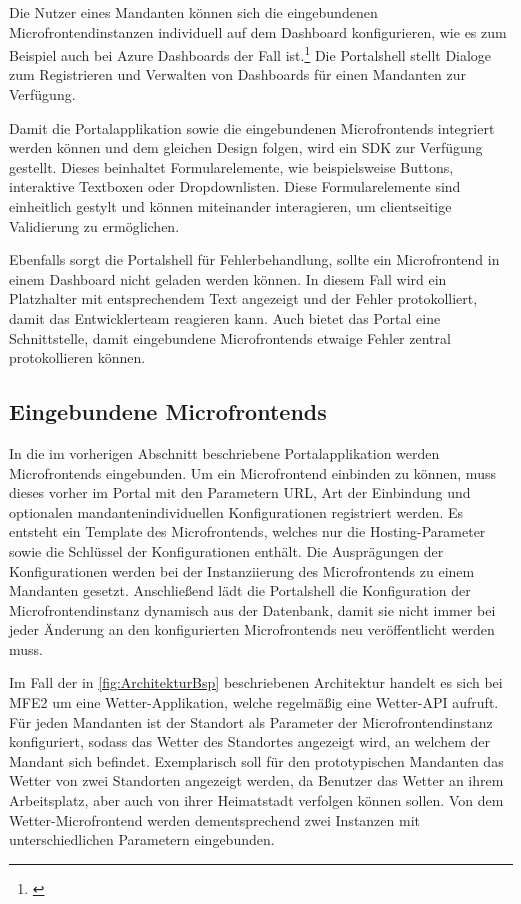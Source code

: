 Die Nutzer eines Mandanten können sich die eingebundenen Microfrontendinstanzen individuell auf dem Dashboard konfigurieren, wie es zum Beispiel auch bei Azure Dashboards der Fall ist.\footnote{\cite[vgl.][]{Microsoft2021a}} Die Portalshell stellt Dialoge zum Registrieren und Verwalten von Dashboards für einen Mandanten zur Verfügung.

Damit die Portalapplikation sowie die eingebundenen Microfrontends integriert werden können und dem gleichen Design folgen, wird ein \gls{SDK} zur Verfügung gestellt. Dieses beinhaltet Formularelemente, wie beispielsweise Buttons, interaktive Textboxen oder Dropdownlisten. Diese Formularelemente sind einheitlich gestylt und können miteinander interagieren, um clientseitige Validierung zu ermöglichen.

Ebenfalls sorgt die Portalshell für Fehlerbehandlung, sollte ein Microfrontend in einem Dashboard nicht geladen werden können. In diesem Fall wird ein Platzhalter mit entsprechendem Text angezeigt und der Fehler protokolliert, damit das Entwicklerteam reagieren kann. Auch bietet das Portal eine Schnittstelle, damit eingebundene Microfrontends etwaige Fehler zentral protokollieren können.

\subsection{Eingebundene Microfrontends}\label{sec:PrototypMicrofrontends}

In die im vorherigen Abschnitt beschriebene Portalapplikation werden Microfrontends eingebunden. Um ein Microfrontend einbinden zu können, muss dieses vorher im Portal mit den Parametern \gls{URL}, Art der Einbindung und optionalen mandantenindividuellen Konfigurationen registriert werden. Es entsteht ein Template des Microfrontends, welches nur die Hosting-Parameter sowie die Schlüssel der Konfigurationen enthält. Die Ausprägungen der Konfigurationen werden bei der Instanziierung des Microfrontends zu einem Mandanten gesetzt. Anschließend lädt die Portalshell die Konfiguration der Microfrontendinstanz dynamisch aus der Datenbank, damit sie nicht immer bei jeder Änderung an den konfigurierten Microfrontends neu veröffentlicht werden muss.

Im Fall der in \cref{fig:ArchitekturBsp} beschriebenen Architektur handelt es sich bei \gls{MFE2} um eine Wetter-Applikation, welche regelmäßig eine Wetter-\gls{API} aufruft. Für jeden Mandanten ist der Standort als Parameter der Microfrontendinstanz konfiguriert, sodass das Wetter des Standortes angezeigt wird, an welchem der Mandant sich befindet. Exemplarisch soll für den prototypischen Mandanten das Wetter von zwei Standorten angezeigt werden, da Benutzer das Wetter an ihrem Arbeitsplatz, aber auch von ihrer Heimatstadt verfolgen können sollen. Von dem Wetter-Microfrontend werden dementsprechend zwei Instanzen mit unterschiedlichen Parametern eingebunden.

